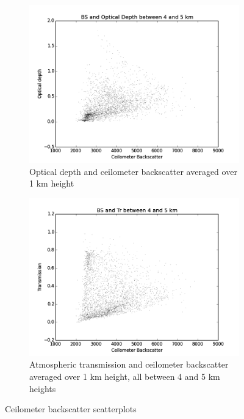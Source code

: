 \documentclass[a4paper,titlepage, twoside]{report}
\begin{document}
\begin{figure}
\begin{subfigure}{0.48\textwidth}
\includegraphics[width=\textwidth]{BS4_tau.png}
\caption{Optical depth and ceilometer backscatter averaged over 1 km height}
\end{subfigure}
\hfill
\begin{subfigure}{0.48\textwidth}
\includegraphics[width=\textwidth]{BS4_Tr.png}
\caption{Atmospheric transmission and ceilometer backscatter averaged over 1 km height, all  between 4 and 5 km heights}
\end{subfigure}
\caption{Ceilometer backscatter scatterplots}
\label{fig:data-12}
\end{figure}
\end{document}
